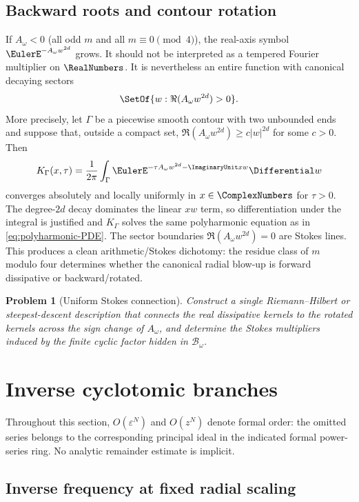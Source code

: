 \documentclass[11pt]{article}
\newtheorem{problem}[theorem]{Problem}
\theoremstyle{definition}
\newcommand{\eps}{\varepsilon}
\begin{document}
\subsection{Backward roots and contour rotation}

If $A_\omega<0$ (all odd $m$ and all $m\equiv0\pmod4$), the real-axis symbol $\EulerE^{-A_\omega w^{2d}}$ grows.  It should not be interpreted as a tempered Fourier multiplier on $\RealNumbers$.  It is nevertheless an entire function with canonical decaying sectors
\begin{equation}
 \SetOf{w:\Re(A_\omega w^{2d})>0}.
 \label{eq:stokes-sectors}
\end{equation}
More precisely, let $\Gamma$ be a piecewise smooth contour with two unbounded
ends and suppose that, outside a compact set,
\(
 \Re(A_\omega w^{2d})\ge c|w|^{2d}
\)
for some $c>0$.  Then
\[
 K_\Gamma(x,\tau)=\frac1{2\pi}\int_\Gamma
 \EulerE^{-\tau A_\omega w^{2d}-\ImaginaryUnit xw}\Differential w
\]
converges absolutely and locally uniformly in $x\in\ComplexNumbers$ for $\tau>0$.
The degree-$2d$ decay dominates the linear $xw$ term, so differentiation under
the integral is justified and $K_\Gamma$ solves the same polyharmonic equation
as in \cref{eq:polyharmonic-PDE}.  The sector boundaries
\(
 \Re(A_\omega w^{2d})=0
\)
are Stokes lines.  This produces a clean arithmetic/Stokes dichotomy: the residue class of $m$ modulo four determines whether the canonical radial blow-up is forward dissipative or backward/rotated.

\begin{problem}[Uniform Stokes connection]
Construct a single Riemann--Hilbert or steepest-descent description that connects the real dissipative kernels to the rotated kernels across the sign change of $A_\omega$, and determine the Stokes multipliers induced by the finite cyclic factor hidden in $\mathscr B_\omega$.
\end{problem}

\section{Inverse cyclotomic branches}

Throughout this section, $O(\eps^N)$ and $O(z^N)$ denote formal order: the
omitted series belongs to the corresponding principal ideal in the indicated
formal power-series ring.  No analytic remainder estimate is implicit.

\subsection{Inverse frequency at fixed radial scaling}
\end{document}
